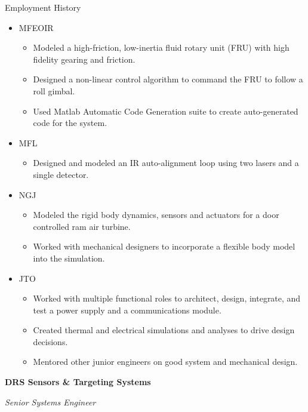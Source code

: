 \begin{rubric}{Employment History}
\begin{itemize}[nosep]
\begin{itemize}[nosep]
            \item Prepared test procedures for the production unit.
        \end{itemize}
        \item MFEOIR
        \begin{itemize}[nosep]
            \item Modeled a high-friction, low-inertia fluid rotary unit (FRU) with high fidelity gearing and friction.
            \item Designed a non-linear control algorithm to command the FRU to follow a roll gimbal.
            \item Used Matlab Automatic Code Generation suite to create auto-generated code for the system.
        \end{itemize}
        \item MFL
        \begin{itemize}[nosep]
            \item Designed and modeled an IR auto-alignment loop using two lasers and a single detector.
        \end{itemize}
        \item NGJ
        \begin{itemize}[nosep]
            \item Modeled the rigid body dynamics, sensors and actuators for a door controlled ram air turbine.
            \item Worked with mechanical designers to incorporate a flexible body model into the simulation.
        \end{itemize}
        \item JTO
        \begin{itemize}[nosep]
            \item Worked with multiple functional roles to architect, design, integrate, and test a power supply and a communications module.
            \item Created thermal and electrical simulations and analyses to drive design decisions.
            \item Mentored other junior engineers on good system and mechanical design.
        \end{itemize}
    \end{itemize}
%
\entry*[06/08 -- 11/14]%
    \textbf{DRS Sensors \& Targeting Systems}\par
    \textit{Senior Systems Engineer}\par
    \begin{itemize}[nosep]

\end{itemize}
\end{rubric}
